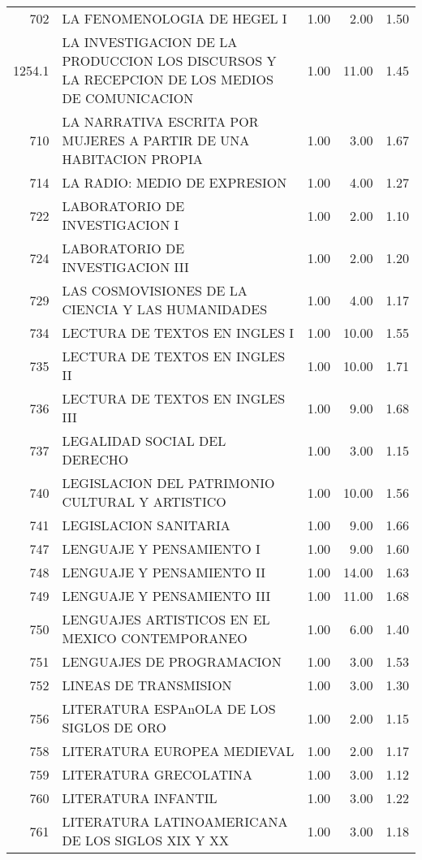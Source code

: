 \begin{table}[ht]
\begin{tabular}{rlrrr}
  702 & LA FENOMENOLOGIA DE HEGEL I & 1.00 & 2.00 & 1.50 \\ 
  1254.1 & LA INVESTIGACION DE LA PRODUCCION LOS DISCURSOS Y LA RECEPCION DE LOS MEDIOS DE COMUNICACION & 1.00 & 11.00 & 1.45 \\ 
  710 & LA NARRATIVA ESCRITA POR MUJERES A PARTIR DE UNA HABITACION PROPIA & 1.00 & 3.00 & 1.67 \\ 
  714 & LA RADIO: MEDIO DE EXPRESION & 1.00 & 4.00 & 1.27 \\ 
  722 & LABORATORIO DE INVESTIGACION I & 1.00 & 2.00 & 1.10 \\ 
  724 & LABORATORIO DE INVESTIGACION III & 1.00 & 2.00 & 1.20 \\ 
  729 & LAS COSMOVISIONES DE LA CIENCIA Y LAS HUMANIDADES & 1.00 & 4.00 & 1.17 \\ 
  734 & LECTURA DE TEXTOS EN INGLES I & 1.00 & 10.00 & 1.55 \\ 
  735 & LECTURA DE TEXTOS EN INGLES II & 1.00 & 10.00 & 1.71 \\ 
  736 & LECTURA DE TEXTOS EN INGLES III & 1.00 & 9.00 & 1.68 \\ 
  737 & LEGALIDAD SOCIAL DEL DERECHO & 1.00 & 3.00 & 1.15 \\ 
  740 & LEGISLACION DEL PATRIMONIO CULTURAL Y ARTISTICO & 1.00 & 10.00 & 1.56 \\ 
  741 & LEGISLACION SANITARIA & 1.00 & 9.00 & 1.66 \\ 
  747 & LENGUAJE Y PENSAMIENTO I & 1.00 & 9.00 & 1.60 \\ 
  748 & LENGUAJE Y PENSAMIENTO II & 1.00 & 14.00 & 1.63 \\ 
  749 & LENGUAJE Y PENSAMIENTO III & 1.00 & 11.00 & 1.68 \\ 
  750 & LENGUAJES ARTISTICOS EN EL MEXICO CONTEMPORANEO & 1.00 & 6.00 & 1.40 \\ 
  751 & LENGUAJES DE PROGRAMACION & 1.00 & 3.00 & 1.53 \\ 
  752 & LINEAS DE TRANSMISION & 1.00 & 3.00 & 1.30 \\ 
  756 & LITERATURA ESPAnOLA DE LOS SIGLOS DE ORO & 1.00 & 2.00 & 1.15 \\ 
  758 & LITERATURA EUROPEA MEDIEVAL & 1.00 & 2.00 & 1.17 \\ 
  759 & LITERATURA GRECOLATINA & 1.00 & 3.00 & 1.12 \\ 
  760 & LITERATURA INFANTIL & 1.00 & 3.00 & 1.22 \\ 
  761 & LITERATURA LATINOAMERICANA DE LOS SIGLOS XIX Y XX & 1.00 & 3.00 & 1.18 \\ 

\end{tabular}
\end{table}
